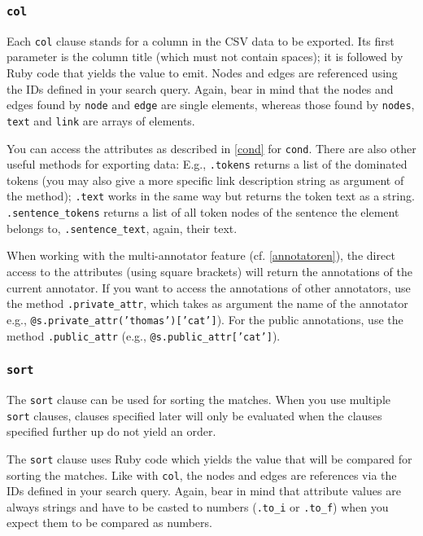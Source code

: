 \documentclass[12pt]{scrartcl}
\begin{document}
\subsubsection{\texttt{col}}

Each \texttt{col} clause stands for a column in the CSV data to be exported.
Its first parameter is the column title (which must not contain spaces); it is followed by Ruby code that yields the value to emit.
Nodes and edges are referenced using the IDs defined in your search query.
Again, bear in mind that the nodes and edges found by \texttt{node} and \texttt{edge} are single elements, whereas those found by \texttt{nodes}, \texttt{text} and \texttt{link} are arrays of elements.

You can access the attributes as described in \ref{cond} for \texttt{cond}.
There are also other useful methods for exporting data:
E.g., \texttt{.tokens} returns a list of the dominated tokens (you may also give a more specific link description string as argument of the method); \texttt{.text} works in the same way but returns the token text as a string.
\texttt{.sentence\_tokens} returns a list of all token nodes of the sentence the element belongs to, \texttt{.sentence\_text}, again, their text. 

When working with the multi-annotator feature (cf. \ref{annotatoren}), the direct access to the attributes (using square brackets) will return the annotations of the current annotator.
If you want to access the annotations of other annotators, use the method \texttt{.private\_attr}, which takes as argument the name of the annotator\\e.g., \texttt{@s.private\_attr('thomas')['cat']}).
For the public annotations, use the method \texttt{.public\_attr} (e.g., \texttt{@s.public\_attr['cat']}).


\subsubsection{\texttt{sort}}

The \texttt{sort} clause can be used for sorting the matches.
When you use multiple \texttt{sort} clauses, clauses specified later will only be evaluated when the clauses specified further up do not yield an order.

The \texttt{sort} clause uses Ruby code which yields the value that will be compared for sorting the matches.
Like with \texttt{col}, the nodes and edges are references via the IDs defined in your search query.
Again, bear in mind that attribute values are always strings and have to be casted to numbers (\texttt{.to\_i} or \texttt{.to\_f}) when you expect them to be compared as numbers.
\end{document}
